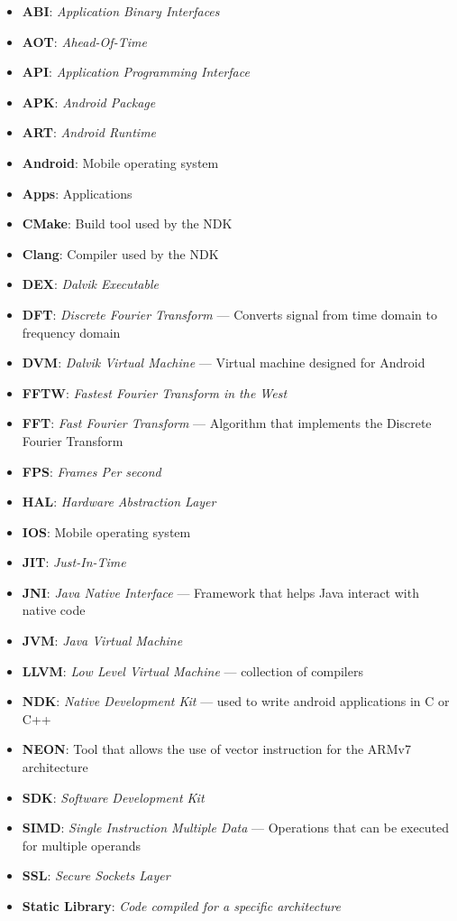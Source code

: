 \begin{itemize}[label={}]
    \item \textbf{ABI}: \emph{Application Binary Interfaces}
    \item \textbf{AOT}: \emph{Ahead-Of-Time}
    \item \textbf{API}: \emph{Application Programming Interface}
    \item \textbf{APK}: \emph{Android Package}
    \item \textbf{ART}: \emph{Android Runtime}
    \item \textbf{Android}: Mobile operating system
    \item \textbf{Apps}: Applications
    \item \textbf{CMake}: Build tool used by the NDK
    \item \textbf{Clang}: Compiler used by the NDK
    \item \textbf{DEX}: \emph{Dalvik Executable}
    \item \textbf{DFT}: \textit{Discrete Fourier Transform} --- Converts signal from time domain to frequency domain
    \item \textbf{DVM}: \textit{Dalvik Virtual Machine} --- Virtual machine designed for Android
    \item \textbf{FFTW}: \emph{Fastest Fourier Transform in the West}
    \item \textbf{FFT}: \textit{Fast Fourier Transform} --- Algorithm that implements the Discrete Fourier Transform
    \item \textbf{FPS}: \emph{Frames Per second}
    \item \textbf{HAL}: \emph{Hardware Abstraction Layer}
    \item \textbf{IOS}: Mobile operating system
    \item \textbf{JIT}: \emph{Just-In-Time}
    \item \textbf{JNI}: \textit{Java Native Interface} --- Framework that helps Java interact with native code
    \item \textbf{JVM}: \emph{Java Virtual Machine}
    \item \textbf{LLVM}: \emph{Low Level Virtual Machine} --- collection of compilers
    \item \textbf{NDK}: \textit{Native Development Kit} --- used to write android applications in C or C++
    \item \textbf{NEON}: Tool that allows the use of vector instruction for the ARMv7 architecture
    \item \textbf{SDK}: \emph{Software Development Kit}
    \item \textbf{SIMD}: \textit{Single Instruction Multiple Data} --- Operations that can be executed for multiple operands
    \item \textbf{SSL}: \emph{Secure Sockets Layer}
    \item \textbf{Static Library}: \emph{Code compiled for a specific architecture}
\end{itemize}

